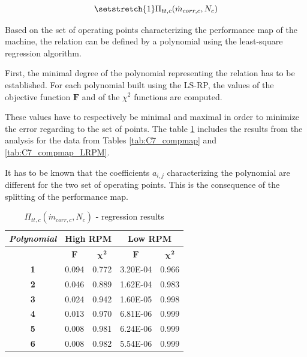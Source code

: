 \begin{equation}
    \setstretch{1}
    \Pi_{tt,c}(\dot{m}_{corr,c},N_c) \label{eq:C7_Pratio}
\end{equation}

Based on the set of operating points characterizing the performance map of the machine, the relation can be defined by a polynomial using the least-square regression algorithm.

First, the minimal degree of the polynomial representing the relation has to be established. For each polynomial built using the LS-RP, the values of the objective function $\textbf{F}$ and of the $\chi^2$ functions are computed. 

These values have to respectively be minimal and maximal in order to minimize the error regarding to the set of points. The table \ref{tab:C7_regcomp} includes the results from the analysis for the data from Tables \ref{tab:C7_compmap} and \ref{tab:C7_compmap_LRPM}. 

It has to be known that the coefficients $a_{i,j}$ characterizing the polynomial are different for the two set of operating points. This is the consequence of the splitting of the performance map. 

\begin{longtable}[c]{@{}ccc|cc@{}}
\caption{$\Pi_{tt,c}(\dot{m}_{corr,c},N_c)$ - regression results }
\label{tab:C7_regcomp}\\
\toprule
\textit{\textbf{Polynomial}} & \multicolumn{2}{c|}{High RPM}  & \multicolumn{2}{c}{Low RPM}    \\* \midrule
\endfirsthead
%
\endhead
%
\bottomrule
\endfoot
%
\endlastfoot
%
\multicolumn{1}{c}{\textbf{Degree}}              & \multicolumn{1}{c}{$\mathbf{F}$} & \multicolumn{1}{c|}{$\mathbf{\chi^2}$} & \multicolumn{1}{c}{$\mathbf{F}$} & \multicolumn{1}{c}{$\mathbf{\chi^2}$} \\
\multicolumn{1}{c}{\textbf{1}}                   & 0.094      & 0.772             & 3.20E-04   & 0.966             \\
\multicolumn{1}{c}{\textbf{2}}                   & 0.046      & 0.889             & 1.62E-04   & 0.983             \\
\multicolumn{1}{c}{\textbf{3}}                   & 0.024      & 0.942             & 1.60E-05   & 0.998             \\
\multicolumn{1}{c}{\textbf{4}}                   & 0.013      & 0.970             & 6.81E-06   & 0.999             \\
\multicolumn{1}{c}{\textbf{5}}                   & 0.008      & 0.981             & 6.24E-06   & 0.999             \\
\multicolumn{1}{c}{\textbf{6}}                   & 0.008      & 0.982             & 5.54E-06   & 0.999             \\* \bottomrule
\end{longtable}


